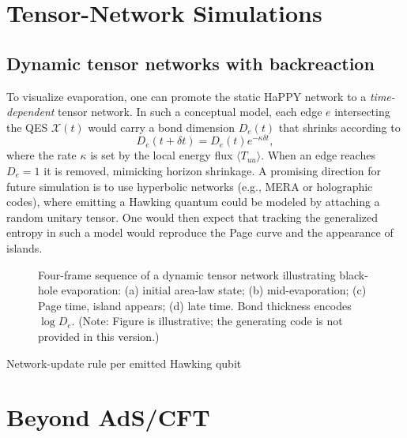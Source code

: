 \documentclass[12pt, numbers, sort&compress]{article}
\begin{document}
\section{Tensor-Network Simulations}
\subsection{Dynamic tensor networks with backreaction}
\label{subsec:dynamicTN}
To visualize evaporation, one can promote the static HaPPY network \cite{HaPPY:2015} to a \emph{time-dependent} tensor network. In such a conceptual model, each edge $e$ intersecting the QES $\mathcal{X}(t)$ would carry a bond dimension $D_e(t)$ that shrinks according to
\begin{equation}
D_e(t+\delta t) = D_e(t) e^{-\kappa \delta t},
\end{equation}
where the rate $\kappa$ is set by the local energy flux $\langle T_{uu}\rangle$. When an edge reaches $D_e=1$ it is removed, mimicking horizon shrinkage. A promising direction for future simulation is to use hyperbolic networks (e.g., MERA \cite{Vidal:2007MERA} or holographic codes), where emitting a Hawking quantum could be modeled by attaching a random unitary tensor. One would then expect that tracking the generalized entropy in such a model would reproduce the Page curve and the appearance of islands.

\begin{figure}[t]
\centering
\caption{Four-frame sequence of a dynamic tensor network illustrating black-hole evaporation: (a) initial area-law state; (b) mid-evaporation; (c) Page time, island appears; (d) late time. Bond thickness encodes $\log D_e$. (Note: Figure is illustrative; the generating code is not provided in this version.)}
\label{fig:dynamicTN}
\end{figure}

\begin{algorithm}[htbp]
\caption{Network-update rule per emitted Hawking qubit}
\end{algorithm}

\section{Beyond AdS/CFT}\label{sec:beyond}
\end{document}
